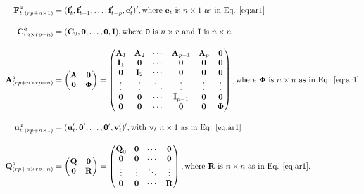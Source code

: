 \documentclass[a4paper]{article}
\begin{document}
\begin{align}
\textbf{F}^a_{t\ (rp+n \times 1)}  &= (\textbf{f}_t', \textbf{f}_{t-1}', \dots, \textbf{f}_{t-p}', \textbf{e}_t')', \text{where $\textbf{e}_t$ is $n\times 1$ as in Eq. \ref{eq:ar1}} \\[1em]
\textbf{C}^a_{(n \times rp+n)}  &= (\textbf{C}_0, \textbf{0}, \dots, \textbf{0}, \textbf{I}), \text{where \textbf{0} is $n\times r$ and \textbf{I} is $n\times n$} \\[1em]
\textbf{A}^a_{(rp+n \times rp+n)}  &= \begin{pmatrix}
\textbf{A} & \textbf{0} \\
\textbf{0} & \mathbf{\Phi}
\end{pmatrix} = \begin{pmatrix}
\textbf{A}_1 & \textbf{A}_2 & \cdots & \textbf{A}_{p-1}  & \textbf{A}_p & \textbf{0}\\
\textbf{I}_1 & \textbf{0} & \cdots & \textbf{0} & \textbf{0} & \textbf{0} \\
\textbf{0} & \textbf{I}_2 & \cdots & \textbf{0} & \textbf{0} & \textbf{0} \\ 
\vdots & \vdots & \ddots & \vdots & \vdots & \vdots \\
\textbf{0} & \textbf{0} & \cdots & \textbf{I}_{p-1} & \textbf{0} & \textbf{0} \\
\textbf{0} & \textbf{0} & \cdots & \textbf{0} & \textbf{0} & \mathbf{\Phi}
\end{pmatrix}, \text{where $\mathbf{\Phi}$ is $n\times n$ as in Eq. \ref{eq:ar1}} \\[1em]
\textbf{u}^a_{t\ (rp+n \times 1)}  &= (\textbf{u}_t', \textbf{0}', \dots, \textbf{0}', \textbf{v}_t')', \text{with $\textbf{v}_t$ $n \times 1$ as in Eq. \ref{eq:ar1}}  \\[1em]
\textbf{Q}^a_{(rp+n \times rp+n)}  &= \begin{pmatrix}
\textbf{Q} & \textbf{0} \\
\textbf{0} & \textbf{R}
\end{pmatrix} = \begin{pmatrix}
\textbf{Q}_0 & \textbf{0} & \cdots &  \textbf{0} \\
\textbf{0} & \textbf{0}& \cdots  & \textbf{0} \\ 
\vdots & \vdots & \ddots  & \vdots \\
\textbf{0} & \textbf{0} & \cdots & \textbf{R}
\end{pmatrix}, \text{where \textbf{R} is $n\times n$ as in Eq. \ref{eq:ar1}.} 
\end{align}
\end{document}
